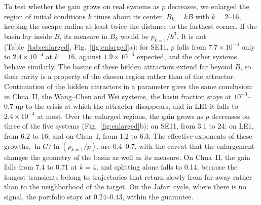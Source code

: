 To test whether the gain grows on real systems as $p$ decreases, we enlarged the region of initial conditions $k$ times about its center, $B_k=kB$ with $k=2$--16, keeping the escape radius at least twice the distance to the farthest corner. If the basin lay inside $B$, its measure in $B_k$ would be $p_{k=1}/k^3$. It is not (Table~\ref{tab:enlarged}, Fig.~\ref{fig:enlarged}a): for SE11, $p$ falls from $7.7\times10^{-3}$ only to $2.4\times10^{-4}$ at $k=16$, against $1.9\times10^{-6}$ expected, and the other systems behave similarly. The basins of these hidden attractors extend far beyond $B$, so their rarity is a property of the chosen region rather than of the attractor. Continuation of the hidden attractors in a parameter gives the same conclusion: in Chua~II, the Wang--Chen and Wei systems, the basin fraction stays at $10^{-3}$--$0.7$ up to the crisis at which the attractor disappears, and in LE1 it falls to $2.4\times10^{-4}$ at most. Over the enlarged regions, the gain grows as $p$ decreases on three of the five systems (Fig.~\ref{fig:enlarged}b): on SE11, from 3.1 to 24; on LE1, from 6.2 to 16; and on Chua~I, from 1.2 to 6.3. The effective exponents of these growths, $\ln G/\ln(p_{k=1}/p)$, are 0.4--0.7, with the caveat that the enlargement changes the geometry of the basin as well as its measure. On Chua~II, the gain falls from 7.4 to 0.71 at $k=4$, and splitting alone falls to 0.14, because the longest transients belong to trajectories that return slowly from far away rather than to the neighborhood of the target. On the Jafari cycle, where there is no signal, the portfolio stays at 0.24--0.43, within the guarantee.


